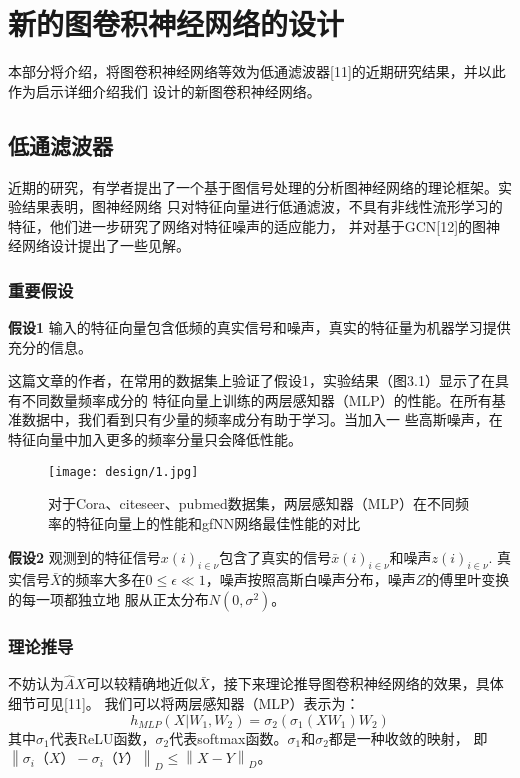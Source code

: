 \cleardoublepage

\section{新的图卷积神经网络的设计}
本部分将介绍，将图卷积神经网络等效为低通滤波器[11]的近期研究结果，并以此作为启示详细介绍我们
设计的新图卷积神经网络。
\subsection{低通滤波器}
近期的研究，有学者提出了一个基于图信号处理的分析图神经网络的理论框架。实验结果表明，图神经网络
只对特征向量进行低通滤波，不具有非线性流形学习的特征，他们进一步研究了网络对特征噪声的适应能力，
并对基于GCN[12]的图神经网络设计提出了一些见解。
\subsubsection{重要假设}

    \textbf{假设1} \quad 输入的特征向量包含低频的真实信号和噪声，真实的特征量为机器学习提供充分的信息。
    
    这篇文章的作者，在常用的数据集上验证了假设1，实验结果（图3.1）显示了在具有不同数量频率成分的
    特征向量上训练的两层感知器（MLP）的性能。在所有基准数据中，我们看到只有少量的频率成分有助于学习。当加入一
    些高斯噪声，在特征向量中加入更多的频率分量只会降低性能。
    \begin{figure}[ht]
        \centering
        \captionsetup{width=10cm}
        \texttt{[image: design/1.jpg]}
        \caption{\label{3-1}对于Cora、citeseer、pubmed数据集，两层感知器（MLP）在不同频率的特征向量上的性能和gfNN网络最佳性能的对比}
    \end{figure}
    
    \textbf{假设2} \quad 
    观测到的特征信号${x(i)}_{i \in \nu}$包含了真实的信号${\bar{x}(i)}_{i \in \nu}$和噪声${z(i)}_{i \in \nu}$.
    真实信号$\bar{X}$的频率大多在$ 0 \le \epsilon \ll 1 $，噪声按照高斯白噪声分布，噪声$Z$的傅里叶变换的每一项都独立地
    服从正太分布$ N(0,\sigma^{2} ) $。


\subsubsection{理论推导}
不妨认为$ \hat{A}X $可以较精确地近似$ \bar{X} $，接下来理论推导图卷积神经网络的效果，具体细节可见[11]。
我们可以将两层感知器（MLP）表示为：
$$ h_{MLP}(X|W_1,W_2) = \sigma_{2}(\sigma_{1}(XW_1)W_2) $$
其中$\sigma_{1}$代表ReLU函数，$\sigma_{2}$代表softmax函数。$\sigma_{1}$和$\sigma_{2}$都是一种收敛的映射，
即$  \left \| \sigma_{i}（X）- \sigma_{i}（Y） \right \|_{D}  \le  \left \| X-Y \right \|_{D} $。

